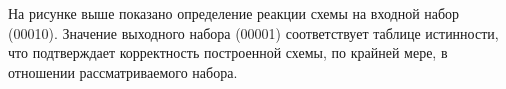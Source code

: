 На рисунке выше показано определение реакции схемы на входной набор (00010). Значение выходного набора (00001) соответствует таблице истинности, что подтверждает корректность построенной схемы, по крайней мере, в отношении рассматриваемого набора.
